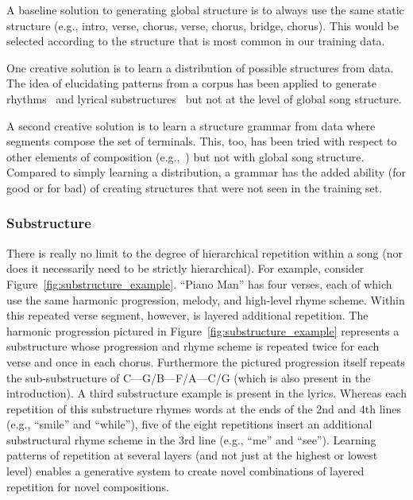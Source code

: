\documentclass[11pt,phd]{byuprop}
\begin{document}
A baseline solution to generating global structure is to always use the same static structure (e.g., intro, verse, chorus, verse, chorus, bridge, chorus). This would be selected according to the structure that is most common in our training data.

One creative solution is to learn a distribution of possible structures from data. The idea of elucidating patterns from a corpus has been applied to generate rhythms~\cite{monteith2012automatic} and lyrical substructures~\cite{scirea2015smug} but not at the level of global song structure. 

A second creative solution is to learn a structure grammar from data where segments compose the set of terminals. This, too, has been tried with respect to other elements of composition (e.g.,~\cite{steedman1984generative}) but not with global song structure. Compared to simply learning a distribution, a grammar has the added ability (for good or for bad) of creating structures that were not seen in the training set.

\subsubsection{Substructure}

There is really no limit to the degree of hierarchical repetition within a song (nor does it necessarily need to be strictly hierarchical). For example, consider Figure~\ref{fig:substructure_example}. ``Piano Man'' has four verses, each of which use the same harmonic progression, melody, and high-level rhyme scheme. Within this repeated verse segment, however, is layered additional repetition. The harmonic progression pictured in Figure~\ref{fig:substructure_example} represents a substructure whose progression and rhyme scheme is repeated twice for each verse and once in each chorus. Furthermore the pictured progression itself repeats the sub-substructure of C---G/B---F/A---C/G (which is also present in the introduction). A third substructure example is present in the lyrics. Whereas each repetition of this substructure rhymes words at the ends of the 2nd and 4th lines (e.g., ``smile'' and ``while''), five of the eight repetitions insert an additional substructural rhyme scheme in the 3rd line (e.g., ``me'' and ``see''). Learning patterns of repetition at several layers (and not just at the highest or lowest level) enables a generative system to create novel combinations of layered repetition for novel compositions.
\end{document}

